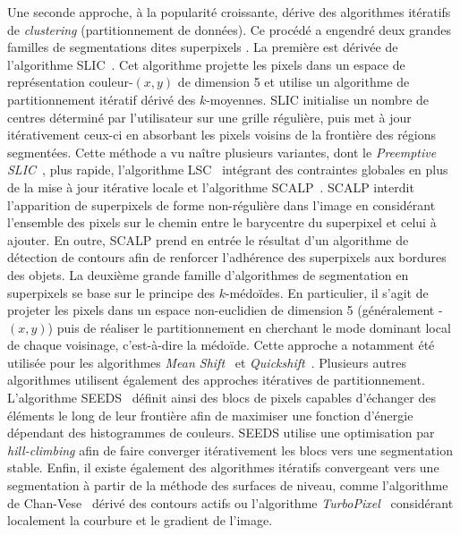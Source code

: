 Une seconde approche, à la popularité croissante, dérive des algorithmes itératifs de \emph{clustering} (partitionnement de données). Ce procédé a engendré deux grandes familles de segmentations dites \og superpixels \fg. La première est dérivée de l'algorithme \gls{SLIC}~\cite{achanta_slic_2010}. Cet algorithme projette les pixels dans un espace de représentation couleur-$(x,y)$ de dimension 5 et utilise un algorithme de partitionnement itératif dérivé des $k$-moyennes. \gls{SLIC} initialise un nombre de centres déterminé par l'utilisateur sur une grille régulière, puis met à jour itérativement ceux-ci en absorbant les pixels voisins de la frontière des régions segmentées. Cette méthode a vu naître plusieurs variantes, dont le \emph{Preemptive SLIC}~\cite{neubert_compact_2014}, plus rapide, l'algorithme \gls{LSC}~\cite{li_superpixel_2015} intégrant des contraintes globales en plus de la mise à jour itérative locale et l'algorithme \gls{SCALP}~\cite{giraud_robust_2018}. \gls{SCALP} interdit l'apparition de superpixels de forme non-régulière dans l'image en considérant l'ensemble des pixels sur le chemin entre le barycentre du superpixel et celui à ajouter. En outre, \gls{SCALP} prend en entrée le résultat d'un algorithme de détection de contours afin de renforcer l'adhérence des superpixels aux bordures des objets.
La deuxième grande famille d'algorithmes de segmentation en superpixels se base sur le principe des $k$-médoïdes. En particulier, il s'agit de projeter les pixels dans un espace non-euclidien de dimension 5 (généralement -$(x,y)$) puis de réaliser le partitionnement en cherchant le mode dominant local de chaque voisinage, c'est-à-dire la médoïde. Cette approche a notamment été utilisée pour les algorithmes \emph{Mean Shift}~\cite{comaniciu_mean_2002} et \emph{Quickshift}~\cite{vedaldi_quick_2008}.
Plusieurs autres algorithmes utilisent également des approches itératives de partitionnement. L'algorithme \gls{SEEDS}~\cite{van_den_bergh_seeds_2012} définit ainsi des blocs de pixels capables d'échanger des éléments le long de leur frontière afin de maximiser une fonction d'énergie dépendant des histogrammes de couleurs. \gls{SEEDS} utilise une optimisation par \emph{hill-climbing} afin de faire converger itérativement les blocs vers une segmentation stable. Enfin, il existe également des algorithmes itératifs convergeant vers une segmentation à partir de la méthode des surfaces de niveau, comme l'algorithme de Chan-Vese~\cite{chan_active_1999} dérivé des contours actifs ou l'algorithme \emph{TurboPixel}~\cite{levinshtein_turbopixels_2009} considérant localement la courbure et le gradient de l'image.

